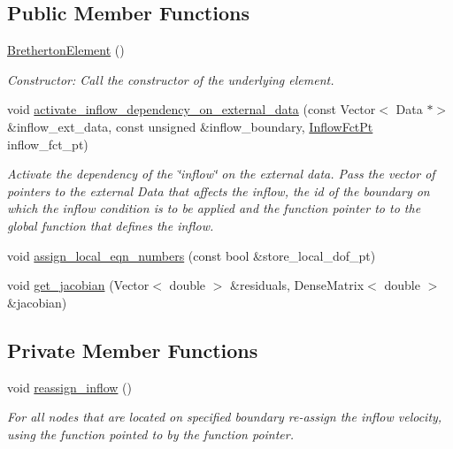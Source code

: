 \subsection*{Public Member Functions}
\begin{DoxyCompactItemize}
\item 
\hyperlink{classBrethertonElement_acbc668eed3ea683a67b6b822d6e59974}{Bretherton\+Element} ()
\begin{DoxyCompactList}\small\item\em Constructor\+: Call the constructor of the underlying element. \end{DoxyCompactList}\item 
void \hyperlink{classBrethertonElement_aa526749ab70cd15ee05c1b58b5f135a6}{activate\+\_\+inflow\+\_\+dependency\+\_\+on\+\_\+external\+\_\+data} (const Vector$<$ Data $\ast$$>$ \&inflow\+\_\+ext\+\_\+data, const unsigned \&inflow\+\_\+boundary, \hyperlink{classBrethertonElement_a313d868ce6fbd8df07b0360db25133ce}{Inflow\+Fct\+Pt} inflow\+\_\+fct\+\_\+pt)
\begin{DoxyCompactList}\small\item\em Activate the dependency of the \char`\"{}inflow\char`\"{} on the external data. Pass the vector of pointers to the external Data that affects the inflow, the id of the boundary on which the inflow condition is to be applied and the function pointer to to the global function that defines the inflow. \end{DoxyCompactList}\item 
void \hyperlink{classBrethertonElement_a40f35d9e03eae08954b6b32badadcf61}{assign\+\_\+local\+\_\+eqn\+\_\+numbers} (const bool \&store\+\_\+local\+\_\+dof\+\_\+pt)
\item 
void \hyperlink{classBrethertonElement_ab0bc00d862b2c888703ed38c74f18b77}{get\+\_\+jacobian} (Vector$<$ double $>$ \&residuals, Dense\+Matrix$<$ double $>$ \&jacobian)
\end{DoxyCompactItemize}
\subsection*{Private Member Functions}
\begin{DoxyCompactItemize}
\item 
void \hyperlink{classBrethertonElement_a7e655df2ed6104862cc70c2408daf93c}{reassign\+\_\+inflow} ()
\begin{DoxyCompactList}\small\item\em For all nodes that are located on specified boundary re-\/assign the inflow velocity, using the function pointed to by the function pointer. \end{DoxyCompactList}\end{DoxyCompactItemize}
